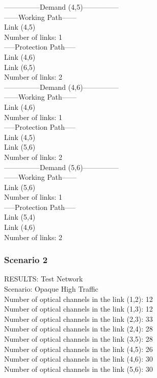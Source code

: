 ---------------Demand (4,5)--------------- \\

------Working Path------ \\
Link  (4,5) \\
Number of links: 1 \\

-----Protection Path----- \\
Link  (4,6) \\
Link  (6,5) \\
Number of links: 2 \\

---------------Demand (4,6)--------------- \\

------Working Path------ \\
Link  (4,6) \\
Number of links: 1 \\

-----Protection Path----- \\
Link  (4,5) \\
Link  (5,6) \\
Number of links: 2 \\

---------------Demand (5,6)--------------- \\

------Working Path------ \\
Link  (5,6) \\
Number of links: 1 \\

-----Protection Path----- \\
Link  (5,4) \\
Link  (4,6) \\
Number of links: 2 \\

\subsubsection{Scenario 2}

\qquad RESULTS: Test Network \\

\quad Scenario: Opaque High Traffic \\

Number of optical channels in the link (1,2): 12 \\
\qquad Number of optical channels in the link (1,3): 12 \\
\qquad Number of optical channels in the link (2,3): 33 \\
\qquad Number of optical channels in the link (2,4): 28 \\
\qquad Number of optical channels in the link (3,5): 28 \\
\qquad Number of optical channels in the link (4,5): 26 \\
\qquad Number of optical channels in the link (4,6): 30 \\
\qquad Number of optical channels in the link (5,6): 30 \\



